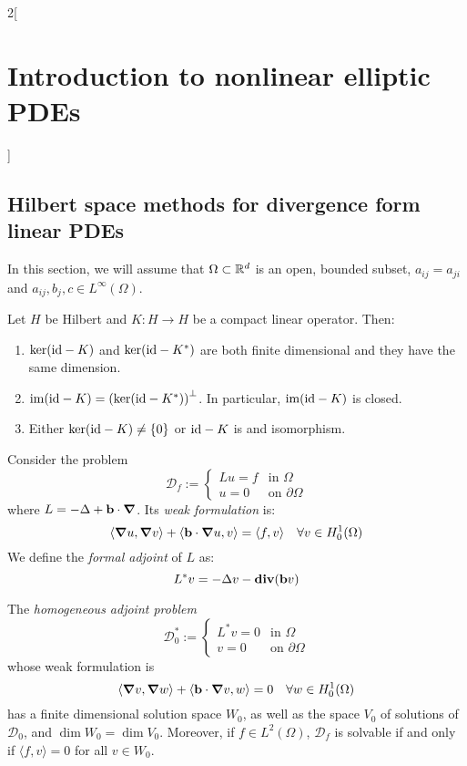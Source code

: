 \documentclass[../../../main_math.tex]{subfiles}
\begin{document}
\begin{multicols}{2}[\section{Introduction to nonlinear elliptic PDEs}]
  \subsection{Hilbert space methods for divergence form linear PDEs}
  In this section, we will assume that $\Omega\subset\mathbb{R}^d$ is an open, bounded subset, $a_{ij}=a_{ji}$ and $a_{ij},b_j,c\in L^\infty(\Omega)$.
  \begin{theorem}
    Let $H$ be Hilbert and $K:H\to H$ be a compact linear operator. Then:
    \begin{enumerate}
      \item $\ker(\mathrm{id}-K)$ and $\ker(\mathrm{id}-K^*)$ are both finite dimensional and they have the same dimension.
      \item $\operatorname{im}(\mathrm{id}-K)={(\ker(\mathrm{id}-K^*))}^\perp$. In particular, $\operatorname{im}(\mathrm{id}-K)$ is closed.
      \item Either $\ker(\mathrm{id}-K)\ne\{0\}$ or $\mathrm{id} -K$ is and isomorphism.
    \end{enumerate}
  \end{theorem}
  \begin{definition}
    Consider the problem
    $$
      \mathcal{D}_f:=\begin{cases}
        Lu=f & \text{in }\Omega         \\
        u=0  & \text{on }\partial\Omega
      \end{cases}
    $$
    where $L=-\Delta+\boldsymbol{\mathrm{b}}\cdot \grad$. Its \emph{weak formulation} is:
    \begin{equation*}
      \langle \grad u,\grad v\rangle+\langle \boldsymbol{\mathrm{b}}\cdot \grad u,v\rangle=\langle f,v\rangle\quad \forall v\in H_0^1(\Omega)
    \end{equation*}
    We define the \emph{formal adjoint} of $L$ as:
    $$
      L^*v=-\Delta v-\operatorname{\boldsymbol{\mathrm{div}}}(\boldsymbol{\mathrm{b}}v)
    $$
  \end{definition}
  \begin{proposition}
    The \emph{homogeneous adjoint problem}
    $$
      \mathcal{D}_0^*:=\begin{cases}
        L^*v=0 & \text{in }\Omega         \\
        v=0    & \text{on }\partial\Omega
      \end{cases}
    $$
    whose weak formulation is
    \begin{equation*}
      \langle \grad v,\grad w\rangle+\langle \boldsymbol{\mathrm{b}}\cdot \grad v,w\rangle=0\quad \forall w\in H_0^1(\Omega)
    \end{equation*}
    has a finite dimensional solution space $W_0$, as well as the space $V_0$ of solutions of $\mathcal{D}_0$, and $\dim W_0=\dim V_0$. Moreover, if $f\in L^2(\Omega)$, $\mathcal{D}_f$ is solvable if and only if $\langle f,v\rangle=0$ for all $v\in W_0$.

\end{proposition}
\end{multicols}
\end{document}
